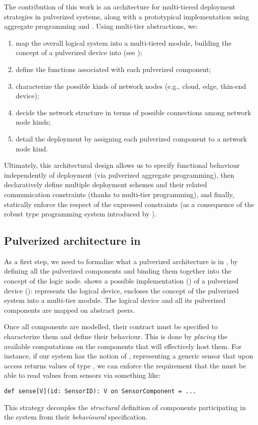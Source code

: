 The contribution of this work is an architecture for multi-tiered deployment strategies in pulverized systems,
along with a prototypical implementation using aggregate programming and \scalaloci{}.
% 
Using multi-tier abstractions, we: 
\begin{enumerate}
  \item map the overall logical system into a multi-tiered module, building the concept of a pulverized device into \scalaloci{} (see );
  \item define the functions associated with each pulverized component;
  \item characterize the possible kinds of network nodes (e.g., cloud, edge, thin-end device);
  \item decide the network structure in terms of possible connections among network node kinds;
  \item detail the deployment by assigning each pulverized component to a network node kind. 
\end{enumerate}
Ultimately, 
 this architectural design allows us to specify functional behaviour independently of deployment
 (via pulverized aggregate programming),
 then declaratively define multiple deployment schemes and their related communication constraints
 (thanks to multi-tier programming),
 and finally, statically enforce the respect of the expressed constraints
 (as a consequence of the robust type programming system introduced by \scalaloci{}).

\subsection{Pulverized architecture in \scalaloci{}}

As a first step, 
 we need to formalize what a pulverized architecture is in \scalaloci{},
 by defining all the pulverized components and binding them together into the concept of the logic node.
%
 shows a possible \scalaloci{} implementation () 
 of a pulverized device ():
 represents the logical device,
 encloses the concept of the pulverized system into a multi-tier module.
%
The logical device and all its pulverized components are mapped on abstract peers.

Once all components are modelled,
 their contract must be specified to characterize them and define their behaviour.
%
This is done by \emph{placing} the available computations on the components that will effectively host them.
%
For instance, 
 if our system has the notion of ,
 representing a generic sensor that upon access returns values of type ,
 we can enforce the requirement that the  must be able to read values from sensors via something like: 
\begin{lstlisting}
def sense[V](id: SensorID): V on SensorComponent = ...
\end{lstlisting}
%
This strategy decouples the \emph{structural} definition of components participating in the system from their \emph{behavioural} specification.

